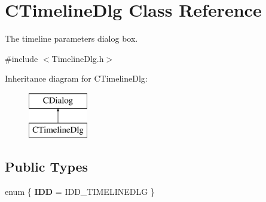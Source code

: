 \hypertarget{class_c_timeline_dlg}{\section{C\+Timeline\+Dlg Class Reference}
\label{class_c_timeline_dlg}
}


The timeline parameters dialog box.  




{\ttfamily \#include $<$Timeline\+Dlg.\+h$>$}

Inheritance diagram for C\+Timeline\+Dlg\+:\begin{figure}[H]
\begin{center}
\leavevmode
\includegraphics[height=2.000000cm]{class_c_timeline_dlg}
\end{center}
\end{figure}
\subsection*{Public Types}
\begin{DoxyCompactItemize}
\item 
\hypertarget{class_c_timeline_dlg_a330aa61151bda4840b8b241bca03793b}{enum \{ {\bfseries I\+D\+D} = I\+D\+D\+\_\+\+T\+I\+M\+E\+L\+I\+N\+E\+D\+L\+G
 \}}\label{class_c_timeline_dlg_a330aa61151bda4840b8b241bca03793b}

\end{DoxyCompactItemize}
